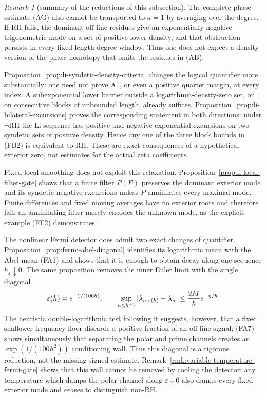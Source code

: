 \documentclass[11pt]{amsart}
\theoremstyle{definition}
\theoremstyle{remark}
\newtheorem{remark}[theorem]{Remark}
\theoremstyle{definition}
\newcommand{\RH}{\mathrm{RH}}
\begin{document}
\begin{remark}[summary of the reductions of this subsection]
The complete-phase estimate (AG) also cannot be transported to $a=1$ by averaging over the degree.
If RH fails, the dominant off-line residues give an exponentially negative trigonometric mode on a
set of positive lower density, and that obstruction persists in every fixed-length degree window.
Thus one does not expect a density version of the phase homotopy that omits the residues in (AB).

Proposition~\ref{prop:li-syndetic-density-criteria} changes the logical
quantifier more substantially: one need not prove A1, or even a positive
quarter margin, at every index.  A subexponential lower barrier outside a
logarithmic-density-zero set, or on consecutive blocks of unbounded length,
already suffices.  Proposition~\ref{prop:li-bilateral-excursions} proves the
corresponding statement in both directions: under $\neg\RH$ the Li sequence
has positive and negative exponential excursions on two syndetic sets of
positive density.  Hence any one of the three block bounds in (FB2) is
equivalent to RH.  These are exact consequences of a hypothetical exterior
zero, not estimates for the actual zeta coefficients.

Fixed local smoothing does not exploit this relaxation.
Proposition~\ref{prop:li-local-filter-gate} shows that a finite filter
$P(E)$ preserves the dominant exterior mode and its syndetic negative
excursions unless $P$ annihilates every maximal mode.  Finite differences
and fixed moving averages have no exterior roots and therefore fail; an
annihilating filter merely encodes the unknown mode, as the explicit
example (FF2) demonstrates.

The nonlinear Fermi detector does admit two exact changes of quantifier.
Proposition~\ref{prop:fermi-abel-diagonal} identifies its logarithmic mean
with the Abel mean (FA1) and shows that it is enough to obtain decay along
one sequence $h_j\downarrow0$.  The same proposition removes the inner
Euler limit with the single diagonal
\[
 \varepsilon(h)=e^{-1/(100h)},\qquad
 \sup_{n\le h^{-1}}|\lambda_{n,\varepsilon(h)}-\lambda_n|
 \le {2M\over h}e^{-\eta/h}.
\]
The heuristic double-logarithmic test following it suggests, however, that a fixed
shallower frequency floor discards a positive fraction of an off-line
signal; (FA7) shows simultaneously that separating the polar and prime
channels creates an $\exp(1/(100h^2))$ conditioning wall.  Thus this
diagonal is a rigorous reduction, not the missing signed estimate.
Remark~\ref{rmk:variable-temperature-fermi-gate} shows that this wall cannot
be removed by cooling the detector: any temperature which damps the polar
channel along $\varepsilon\downarrow0$ also damps every fixed exterior mode
and ceases to distinguish non-RH.


\end{remark}
\end{document}

